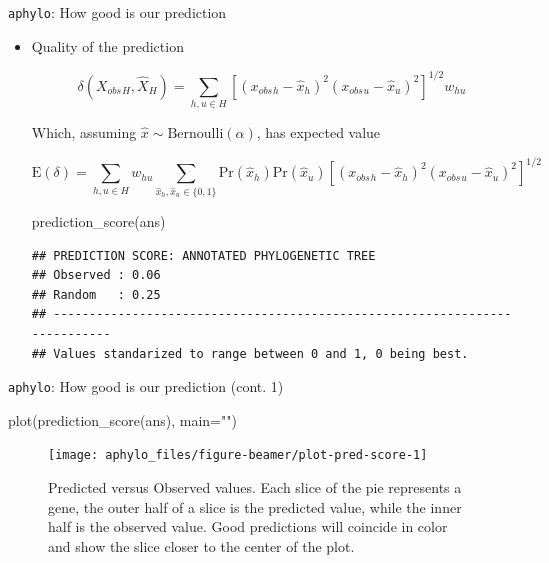 \documentclass[9pt,ignorenonframetext,aspectratio=169]{beamer}
\newenvironment{Shaded}{\begin{snugshade}}{\end{snugshade}}
\newcommand{\KeywordTok}[1]{\textcolor[rgb]{0.94,0.87,0.69}{#1}}
\newcommand{\DataTypeTok}[1]{\textcolor[rgb]{0.87,0.87,0.75}{#1}}
\newcommand{\StringTok}[1]{\textcolor[rgb]{0.80,0.58,0.58}{#1}}
\newcommand{\NormalTok}[1]{\textcolor[rgb]{0.80,0.80,0.80}{#1}}
\renewcommand{\Pr}[1]{{\mbox{Pr}\left(#1\right) }}
\newcommand{\Expected}[1]{{\mbox{E}\left(#1\right)}}
\newcommand{\AnnObs}{{X_{obs}}{}}%
\newcommand{\annObs}{{x_{obs}}{}}%
\newcommand{\AnnPred}{\hat X{}}
\newcommand{\annPred}{\hat x{}}
\begin{document}
\begin{frame}[fragile,t]{\texttt{aphylo}: How good is our prediction}

\begin{itemize}
\item
  Quality of the prediction\pause

  \[
  \label{eq:delta1}
  \delta\left(\AnnObs_H, \AnnPred_H\right) = 
  \sum_{h, u \in H}\left[(\annObs_{h} - \annPred_{h})^2(\annObs_{u} - \annPred_{u})^2\right]^{1/2}w_{hu}
  \]

  \pause

  Which, assuming \(\annPred\sim \mbox{Bernoulli}(\alpha)\), has
  expected value

  \[
  \Expected{\delta} = 
  \sum_{h, u \in H}w_{hu}\sum_{\annPred_h, \annPred_u \in \{0,1\}}\Pr{\annPred_h}\Pr{\annPred_u}\left[
  (\annObs_{h} - \annPred_{h})^2(\annObs_{u} - \annPred_{u})^2\right]^{1/2}
  \]

  \footnotesize

\begin{Shaded}
\begin{Highlighting}[]
\KeywordTok{prediction_score}\NormalTok{(ans)}
\end{Highlighting}
\end{Shaded}

\begin{verbatim}
## PREDICTION SCORE: ANNOTATED PHYLOGENETIC TREE
## Observed : 0.06 
## Random   : 0.25 
## ---------------------------------------------------------------------------
## Values standarized to range between 0 and 1, 0 being best.
\end{verbatim}

  \normalsize
\end{itemize}

\end{frame}

\begin{frame}[fragile,t]{\texttt{aphylo}: How good is our prediction
(cont. 1)}

\footnotesize

\begin{Shaded}
\begin{Highlighting}[]
\KeywordTok{plot}\NormalTok{(}\KeywordTok{prediction_score}\NormalTok{(ans), }\DataTypeTok{main=}\StringTok{""}\NormalTok{)}
\end{Highlighting}
\end{Shaded}

\begin{figure}

{\centering \texttt{[image: aphylo\_files/figure-beamer/plot-pred-score-1]} 

}

\caption{Predicted versus Observed values. Each slice of the pie represents a gene, the outer half of a slice is the predicted value, while the inner half is the observed value. Good predictions will coincide in color and show the slice closer to the center of the plot.}\label{fig:plot-pred-score}
\end{figure}

\normalsize

\end{frame}
\end{document}
